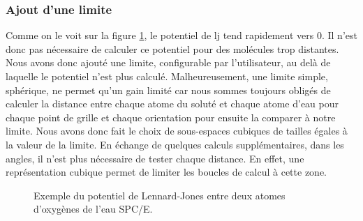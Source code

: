 \subsubsection{Ajout d'une limite}
Comme on le voit sur la figure \ref{fig:lj}, le potentiel de lj tend rapidement vers 0. Il n'est donc pas nécessaire de calculer ce potentiel pour des molécules trop distantes. Nous avons donc ajouté une limite, configurable par l'utilisateur, au delà de laquelle le potentiel n'est plus calculé. Malheureusement, une limite simple, sphérique, ne permet qu'un gain limité car nous sommes toujours obligés de calculer la distance entre chaque atome du soluté et chaque atome d'eau pour chaque point de grille et chaque orientation pour ensuite la comparer à notre limite. Nous avons donc fait le choix de sous-espaces cubiques de tailles égales à la valeur de la limite. En échange de quelques calculs supplémentaires, dans les angles, il n'est plus nécessaire de tester chaque distance. En effet, une représentation cubique permet de limiter les boucles de calcul à cette zone.




\begin{figure}[H]
    \center    
    \caption{Exemple du potentiel de Lennard-Jones entre deux atomes d'oxygènes de l'eau SPC/E.}
    \label{fig:lj}
\end{figure}


